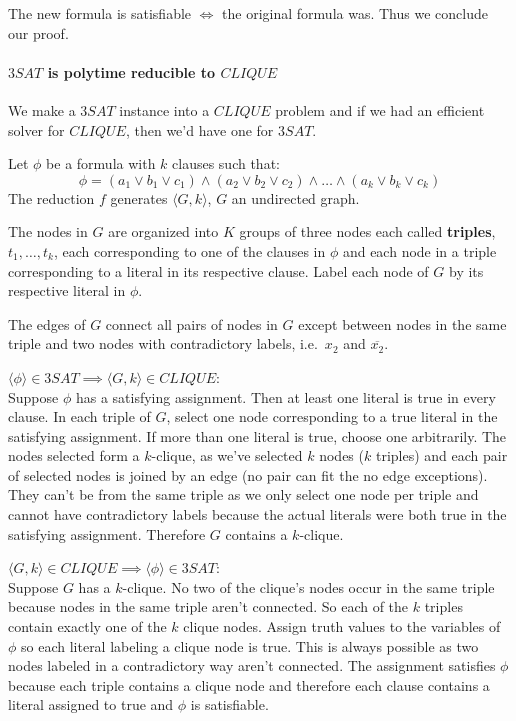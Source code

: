 \documentclass[12 pt]{article}
\begin{document}
The new formula is satisfiable $\iff$ the original formula was. Thus
we conclude our proof.

\paragraph{$3SAT$ is polytime reducible to $CLIQUE$} We make a $3SAT$
instance into a $CLIQUE$ problem and if we had an efficient solver for
$CLIQUE$, then we'd have one for $3SAT$.

Let $\phi$ be a formula with $k$ clauses such that:
$$\phi = (a_1 \lor b_1 \lor c_1) \land (a_2 \lor b_2 \lor c_2) \land
\ldots \land (a_k \lor b_k \lor c_k)$$
The reduction $f$ generates $\langle G,k \rangle$, $G$ an undirected
graph.

The nodes in $G$ are organized into $K$ groups of three nodes each
called \textbf{triples}, $t_1,\ldots, t_k$, each corresponding to one
of the clauses in $\phi$ and each node in a triple corresponding to a
literal in its respective clause. Label each node of $G$ by its
respective literal in $\phi$.

The edges of $G$ connect all pairs of nodes in $G$ except between
nodes in the same triple and two nodes with contradictory labels,
i.e.\ $x_2$ and $\overline{x_2}$.

$\langle \phi \rangle \in 3SAT \implies \langle G,k \rangle \in
CLIQUE$:
\\ Suppose $\phi$ has a satisfying assignment. Then at least one
literal is true in every clause. In each triple of $G$, select one
node corresponding to a true literal in the satisfying assignment. If
more than one literal is true, choose one arbitrarily. The nodes
selected form a $k$-clique, as we've selected $k$ nodes ($k$ triples)
and each pair of selected nodes is joined by an edge (no pair can fit
the no edge exceptions). They can't be from the same triple as we only
select one node per triple and cannot have contradictory labels
because the actual literals were both true in the satisfying
assignment. Therefore $G$ contains a $k$-clique.

$\langle G,k \rangle \in CLIQUE \implies \langle \phi \rangle \in
3SAT$:
\\ Suppose $G$ has a $k$-clique. No two of the clique's nodes occur in
the same triple because nodes in the same triple aren't connected. So
each of the $k$ triples contain exactly one of the $k$ clique
nodes. Assign truth values to the variables of $\phi$ so each literal
labeling a clique node is true. This is always possible as two nodes
labeled in a contradictory way aren't connected. The assignment
satisfies $\phi$ because each triple contains a clique node and
therefore each clause contains a literal assigned to true and $\phi$
is satisfiable.
\end{document}
